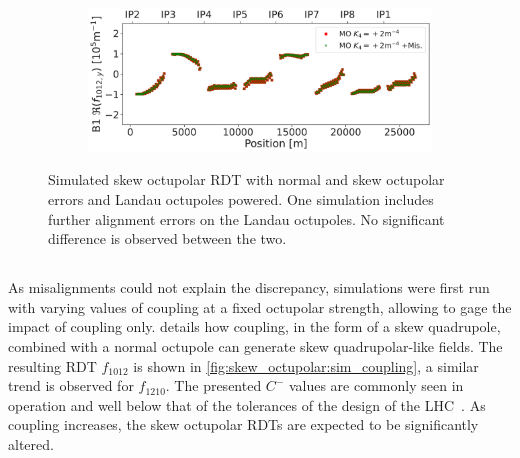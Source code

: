 \begin{figure}[!htb]
    \centering
    \begin{subfigure}{0.8\textwidth}
        \includegraphics[width=\textwidth]{./images/skew_octupoles/f1012_misalign_REAL.pdf}
    \end{subfigure}
    \caption{Simulated skew octupolar RDT with normal and skew octupolar errors and Landau octupoles
    powered. One simulation includes further alignment errors on the Landau octupoles. No 
    significant difference is observed between the two.}
    \label{fig:skew_octupolar:sim_misalign}
\end{figure}



\subsection{}

As misalignments could not explain the discrepancy, simulations were first run with varying values
of coupling at a fixed octupolar strength, allowing to gage the impact of coupling only.
 details how coupling, in the form of a
skew quadrupole, combined with a normal octupole can generate skew quadrupolar-like fields.
The resulting RDT $f_{1012}$ is shown in \cref{fig:skew_octupolar:sim_coupling}, a similar trend is
observed for $f_{1210}$.
The presented $C^{-}$ values are commonly seen in operation and well below that of the
tolerances of the design of the LHC~\cite{bruning_lhc_2004}. As coupling increases, the skew
octupolar RDTs are expected to be significantly altered.


